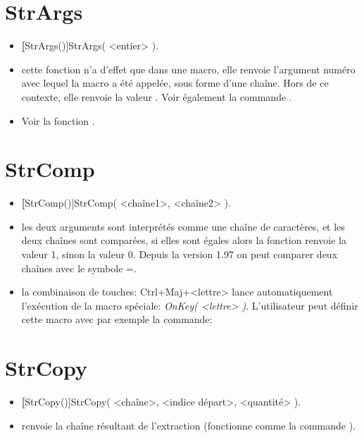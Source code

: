 \section{StrArgs}\label{cmdStrArgs}

\begin{itemize}
 \item \util \textbf[StrArgs()]{StrArgs( <entier> )}. 
 \item \desc cette fonction n'a d'effet que dans une macro, elle renvoie l'argument numéro  avec lequel la macro a été appelée, sous forme d'une chaîne. Hors de ce contexte, elle renvoie la valeur \Nil. Voir également la commande .
 \item\exem Voir la fonction .
\end{itemize}

\section{StrComp}\label{cmdStrComp}

\begin{itemize}
 \item \util \textbf[StrComp()]{StrComp( <chaîne1>, <chaîne2> )}.
 \item \desc les deux arguments sont interprétés comme une chaîne de caractères, et les deux chaînes sont comparées, si elles sont égales alors la fonction renvoie la valeur 1, sinon la valeur 0. Depuis la version 1.97 on peut comparer deux chaînes avec le symbole =. 
 \item \exem la combinaison de touches: Ctrl+Maj+<lettre> lance automatiquement l'exécution de la macro spéciale: \textsl{ OnKey( <lettre> )}. L'utilisateur peut définir cette macro avec par exemple la commande:

\centerline{}

\end{itemize}

\section{StrCopy}\label{cmdStrCopy}

\begin{itemize}
 \item \util \textbf[StrCopy()]{StrCopy( <chaîne>, <indice départ>, <quantité> )}.
 \item \desc renvoie la chaîne résultant de l'extraction (fonctionne comme la commande ).
\end{itemize}

